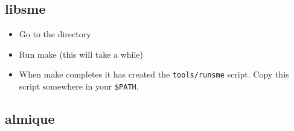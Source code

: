 \subsection{libsme}
\begin{itemize}
\item Go to the \libsme{} directory
\item Run {\ttfamily make} (this will take a while)
\item When {\ttfamily make} completes it has created the \texttt{tools/runsme}
  script. Copy this script somewhere in your \texttt{\$PATH}.
\end{itemize}

\subsection{almique}


